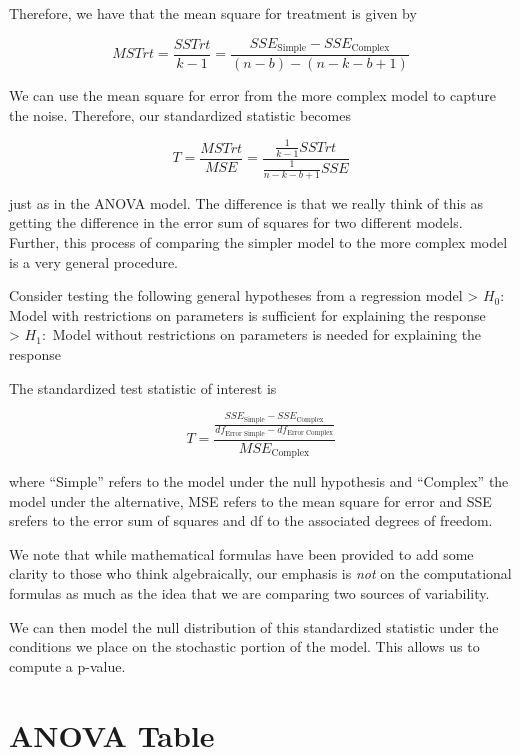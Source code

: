 \documentclass[
]{book}
\theoremstyle{plain}
\theoremstyle{mydefn}
\theoremstyle{myexmpl}
\theoremstyle{remark}
\begin{document}
Therefore, we have that the mean square for treatment is given by

\[MSTrt = \frac{SSTrt}{k - 1} = \frac{SSE_{\text{Simple}} - SSE_{\text{Complex}}}{(n - b) - (n - k - b + 1)}\]

We can use the mean square for error from the more complex model to capture the noise. Therefore, our standardized statistic becomes

\[T = \frac{MSTrt}{MSE} = \frac{\frac{1}{k-1} SSTrt}{\frac{1}{n-k-b+1} SSE}\]

just as in the ANOVA model. The difference is that we really think of this as getting the difference in the error sum of squares for two different models. Further, this process of comparing the simpler model to the more complex model is a very general procedure.

\begin{rmdtip}
Consider testing the following general hypotheses from a regression model
\textgreater{} \(H_0:\) Model with restrictions on parameters is sufficient for explaining the response\\
\textgreater{} \(H_1:\) Model without restrictions on parameters is needed for explaining the response

The standardized test statistic of interest is

\[T = \frac{\frac{SSE_{\text{Simple}} - SSE_{\text{Complex}}}{df_{\text{Error Simple}} - df_{\text{Error Complex}}}}{MSE_{\text{Complex}}}
\]

where ``Simple'' refers to the model under the null hypothesis and ``Complex'' the model under the alternative, MSE refers to the mean square for error and SSE srefers to the error sum of squares and df to the associated degrees of freedom.
\end{rmdtip}

We note that while mathematical formulas have been provided to add some clarity to those who think algebraically, our emphasis is \emph{not} on the computational formulas as much as the idea that we are comparing two sources of variability.

We can then model the null distribution of this standardized statistic under the conditions we place on the stochastic portion of the model. This allows us to compute a p-value.

\hypertarget{anova-table-1}{%
\section{ANOVA Table}\label{anova-table-1}}
\end{document}
